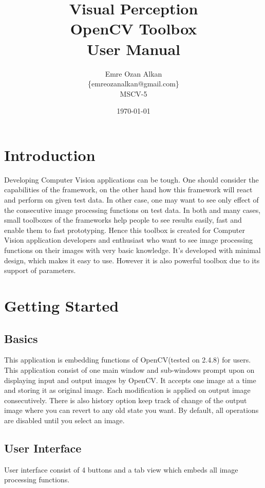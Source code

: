 \documentclass{article}
\title{Visual Perception\\
		OpenCV Toolbox\\
		User Manual}
\author{Emre Ozan Alkan\\
		\{emreozanalkan@gmail.com\}\\
		MSCV-5}
\date{\today}
\begin{document}
\maketitle

\section{Introduction}
	Developing Computer Vision applications can be tough. One should consider the capabilities of the framework, on the other hand how this framework will react and perform on given test data. In other case, one may want to see only effect of the consecutive image processing functions on test data. In both and many cases, small toolboxes of the frameworks help people to see results easily, fast and enable them to fast prototyping. Hence this toolbox is created for Computer Vision application developers and enthusiast who want to see image processing functions on their images with very basic knowledge. It's developed with minimal design, which makes it easy to use. However it is also powerful toolbox due to its support of parameters.
	
	
\section{Getting Started}

	\subsection{Basics}
	This application is embedding functions of OpenCV(tested on 2.4.8) for users. This application consist of one main window and sub-windows prompt upon on displaying input and output images by OpenCV. It accepts one image at a time and storing it as original image. Each modification is applied on output image consecutively. There is also history option keep track of change of the output image where you can revert to any old state you want. By default, all operations are disabled until you select an image.
	
	\subsection{User Interface}
	User interface consist of 4 buttons and a tab view which embeds all image processing functions. \par
\end{document}
